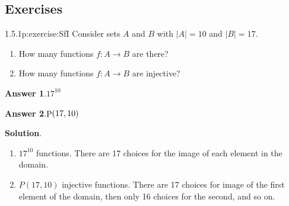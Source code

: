\documentclass[twoside,11pt,]{book}
\newcommand{\blocktitlefont}{\relax}
\numberwithin{equation}{chapter}
\begin{document}
\subsection*{Exercises}
\begin{divisionsolution}{1.5.1}{}{p:exercise:SfI}%
Consider sets \(A\) and \(B\) with \(|A| = 10\) and \(|B| = 17\text{.}\)%
\begin{enumerate}[label=(\alph*)]
\item{}How many functions \(f: A \to B\) are there?%
\item{}How many functions \(f: A \to B\) are injective?%
\end{enumerate}
%
\par\smallskip%
\noindent\textbf{\blocktitlefont Answer 1}.\quad{}\(17^{10}\)%
\par\smallskip%
\noindent\textbf{\blocktitlefont Answer 2}.\quad{}\(\mathop{\rm P}\nolimits\!\left(17,10\right)\)%
\par\smallskip%
\noindent\textbf{\blocktitlefont Solution}.\quad{}%
\begin{enumerate}[label=(\alph*)]
\item{}\(17^{10}\) functions. There are 17 choices for the image of each element in the domain.%
\item{}\(P(17, 10)\) injective functions. There are 17 choices for image of the first element of the domain, then only 16 choices for the second, and so on.%
\end{enumerate}
%
\end{divisionsolution}%
\end{document}
